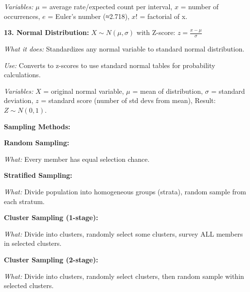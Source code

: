 \documentclass[10pt]{extarticle}
\begin{document}
\begin{multicol}{2}
\textit{Variables:} $\mu$ = average rate/expected count per interval, $x$ = number of occurrences, $e$ = Euler's number (≈2.718), $x!$ = factorial of x.

\vspace{3pt}

\textbf{13. Normal Distribution:} $X \sim N(\mu, \sigma)$ with Z-score: $z = \frac{x-\mu}{\sigma}$

\textit{What it does:} Standardizes any normal variable to standard normal distribution. 

\textit{Use:} Converts to z-scores to use standard normal tables for probability calculations. 

\textit{Variables:} $X$ = original normal variable, $\mu$ = mean of distribution, $\sigma$ = standard deviation, $z$ = standard score (number of std devs from mean), Result: $Z \sim N(0,1)$.

\vspace{5pt}
\textbf{Sampling Methods:}

\vspace{2pt}
\textbf{Random Sampling:} 

\textit{What:} Every member has equal selection chance. 

\vspace{2pt}
\textbf{Stratified Sampling:} 

\textit{What:} Divide population into homogeneous groups (strata), random sample from each stratum. 

\vspace{2pt}
\textbf{Cluster Sampling (1-stage):} 

\textit{What:} Divide into clusters, randomly select some clusters, survey ALL members in selected clusters. 

\vspace{2pt}
\textbf{Cluster Sampling (2-stage):} 

\textit{What:} Divide into clusters, randomly select clusters, then random sample within selected clusters. 

\end{multicol}
\end{document}
